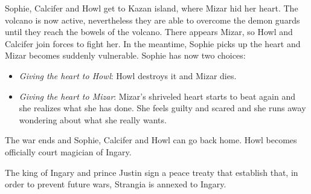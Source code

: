 Sophie, Calcifer and Howl get to Kazan island, where Mizar hid her heart. The volcano is now active, nevertheless they are able to overcome the demon guards until they reach the bowels of the volcano. There appears Mizar, so Howl and Calcifer join forces to fight her. In the meantime, Sophie picks up the heart and Mizar becomes suddenly vulnerable. Sophie has now two choices:
\begin{itemize}
\item \textit{Giving the heart to Howl}: Howl destroys it and Mizar dies.
\item \textit{Giving the heart to Mizar}: Mizar's shriveled heart starts to beat again and she realizes what she has done. She feels guilty and scared and she runs away wondering about what she really wants.
\end{itemize} 

The war ends and Sophie, Calcifer and Howl can go back home. Howl becomes officially court magician of Ingary.

The king of Ingary and prince Justin sign a peace treaty that establish that, in order to prevent future wars, Strangia is annexed to Ingary.
